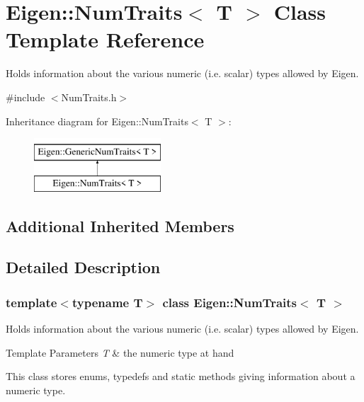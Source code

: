 \hypertarget{struct_eigen_1_1_num_traits}{}\section{Eigen\+::Num\+Traits$<$ T $>$ Class Template Reference}
\label{struct_eigen_1_1_num_traits}


Holds information about the various numeric (i.\+e. scalar) types allowed by Eigen.  




{\ttfamily \#include $<$Num\+Traits.\+h$>$}

Inheritance diagram for Eigen\+::Num\+Traits$<$ T $>$\+:\begin{figure}[H]
\begin{center}
\leavevmode
\includegraphics[height=2.000000cm]{struct_eigen_1_1_num_traits}
\end{center}
\end{figure}
\subsection*{Additional Inherited Members}


\subsection{Detailed Description}
\subsubsection*{template$<$typename T$>$\newline
class Eigen\+::\+Num\+Traits$<$ T $>$}

Holds information about the various numeric (i.\+e. scalar) types allowed by Eigen. 


\begin{DoxyTemplParams}{Template Parameters}
{\em T} & the numeric type at hand\\
\hline
\end{DoxyTemplParams}
This class stores enums, typedefs and static methods giving information about a numeric type.

